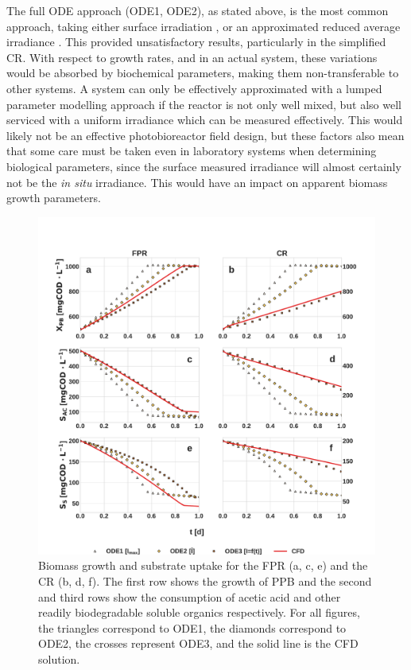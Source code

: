 The full ODE approach (ODE1, ODE2), as stated above, is the most common approach, taking either surface irradiation \cite{uyar2007, zhou2014}, or an approximated reduced average irradiance \cite{lee1987, molinagrima1996, bordel2009}. This provided unsatisfactory results, particularly in the simplified CR. With respect to growth rates, and in an actual system, these variations would be absorbed by biochemical parameters, making them non-transferable to other systems. A system can only be effectively approximated with a lumped parameter modelling approach if the reactor is not only well mixed, but also well serviced with a uniform irradiance which can be measured effectively. This would likely not be an effective photobioreactor field design, but these factors also mean that some care must be taken even in laboratory systems when determining biological parameters, since the surface measured irradiance will almost certainly not be the \textit{in situ} irradiance. This would have an impact on apparent biomass growth parameters. 
\skippingparagraph

\begin{figure}[ht]
\hspace*{-0.75cm}
\includegraphics[scale=0.5]{Images/Chap3/growth_kinetics.pdf}
\caption{Biomass growth and substrate uptake for the FPR (a, c, e) and the CR (b, d, f). The first row shows the growth of PPB and the second and third rows show the consumption of acetic acid and other readily biodegradable soluble organics respectively. For all figures, the triangles correspond to ODE1, the diamonds correspond to ODE2, the crosses represent ODE3, and the solid line is the CFD solution.}
\label{fig:growth_evol}
\end{figure}

